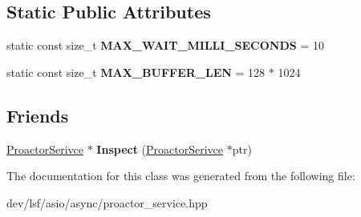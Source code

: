 \subsection*{Static Public Attributes}
\begin{DoxyCompactItemize}
\item 
\hypertarget{classlsf_1_1asio_1_1async_1_1ProactorSerivce_a5a95395f27d3b5d57cd3892bde54154c}{
static const size\_\-t {\bfseries MAX\_\-WAIT\_\-MILLI\_\-SECONDS} = 10}
\label{classlsf_1_1asio_1_1async_1_1ProactorSerivce_a5a95395f27d3b5d57cd3892bde54154c}

\item 
\hypertarget{classlsf_1_1asio_1_1async_1_1ProactorSerivce_a052f9070bdd7ff10c24ccb2125b4244c}{
static const size\_\-t {\bfseries MAX\_\-BUFFER\_\-LEN} = 128 $\ast$ 1024}
\label{classlsf_1_1asio_1_1async_1_1ProactorSerivce_a052f9070bdd7ff10c24ccb2125b4244c}

\end{DoxyCompactItemize}
\subsection*{Friends}
\begin{DoxyCompactItemize}
\item 
\hypertarget{classlsf_1_1asio_1_1async_1_1ProactorSerivce_a23aa0d9f9675607f604ca5189754360a}{
\hyperlink{classlsf_1_1asio_1_1async_1_1ProactorSerivce}{ProactorSerivce} $\ast$ {\bfseries Inspect} (\hyperlink{classlsf_1_1asio_1_1async_1_1ProactorSerivce}{ProactorSerivce} $\ast$ptr)}
\label{classlsf_1_1asio_1_1async_1_1ProactorSerivce_a23aa0d9f9675607f604ca5189754360a}

\end{DoxyCompactItemize}


The documentation for this class was generated from the following file:\begin{DoxyCompactItemize}
\item 
dev/lsf/asio/async/proactor\_\-service.hpp\end{DoxyCompactItemize}
